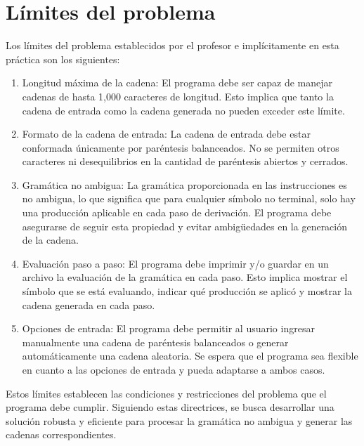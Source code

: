 \section{Límites del problema}%
Los límites del problema establecidos por el profesor e implícitamente en esta práctica son los siguientes:\newline
\begin{enumerate}
    \item Longitud máxima de la cadena: El programa debe ser capaz de manejar cadenas de hasta 1,000 caracteres de longitud. Esto implica que tanto la cadena de entrada como la cadena generada no pueden exceder este límite.\newline

    \item Formato de la cadena de entrada: La cadena de entrada debe estar conformada únicamente por paréntesis balanceados. No se permiten otros caracteres ni desequilibrios en la cantidad de paréntesis abiertos y cerrados.\newline
    
    \item Gramática no ambigua: La gramática proporcionada en las instrucciones es no ambigua, lo que significa que para cualquier símbolo no terminal, solo hay una producción aplicable en cada paso de derivación. El programa debe asegurarse de seguir esta propiedad y evitar ambigüedades en la generación de la cadena.\newline
    
    \item Evaluación paso a paso: El programa debe imprimir y/o guardar en un archivo la evaluación de la gramática en cada paso. Esto implica mostrar el símbolo que se está evaluando, indicar qué producción se aplicó y mostrar la cadena generada en cada paso.\newline
    
    \item Opciones de entrada: El programa debe permitir al usuario ingresar manualmente una cadena de paréntesis balanceados o generar automáticamente una cadena aleatoria. Se espera que el programa sea flexible en cuanto a las opciones de entrada y pueda adaptarse a ambos casos.\newline
    
\end{enumerate}
Estos límites establecen las condiciones y restricciones del problema que el programa debe cumplir. Siguiendo estas directrices, se busca desarrollar una solución robusta y eficiente para procesar la gramática no ambigua y generar las cadenas correspondientes.\newline

